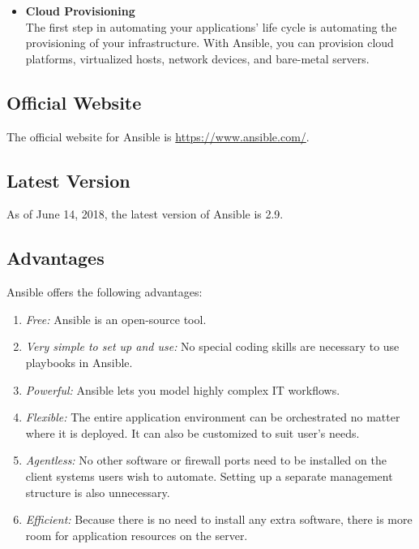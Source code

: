 \documentclass[a4paper, 12pt]{article}
\begin{document}
\begin{itemize}
\item
\textbf{Cloud Provisioning}\\
The first step in automating your applications' life cycle is automating the provisioning of your infrastructure. With Ansible, you can provision cloud platforms, virtualized hosts, network devices, and bare-metal servers.
\end{itemize}

\subsection{Official Website}
The official website for Ansible is \href{https://www.ansible.com/}{https://www.ansible.com/}.
\subsection{Latest Version}
As of June 14, 2018, the latest version of Ansible is 2.9.
\subsection{Advantages}
Ansible offers the following advantages:
\begin{enumerate}
\item
\textit{Free:} Ansible is an open-source tool.
\item
\textit{Very simple to set up and use:} No special coding skills are necessary to use playbooks in Ansible.
\item
\textit{Powerful:} Ansible lets you model highly complex IT workflows.
\item
\textit{Flexible:} The entire application environment can be orchestrated no matter where it is deployed. It can also be customized to suit user's needs.
\item
\textit{Agentless:} No other software or firewall ports need to be installed on the client systems users wish to automate. Setting up a separate management structure is also unnecessary. 
\item
\textit{Efficient:} Because there is no need to install any extra software, there is more room for application resources on the server.
\end{enumerate}
\end{document}
